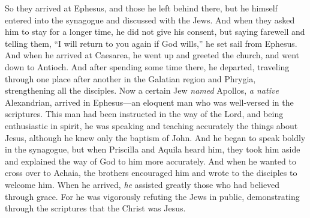 \begin{biblechapter}
\verse So they arrived at Ephesus, and those he left behind there, but he himself entered into the synagogue and discussed with the Jews.
\verse And when they asked him to stay for a longer time, he did not give his consent,
\verse but saying farewell and telling them, “I will return to you again if God wills,” he set sail from Ephesus.
\verse And when he arrived at Caesarea, he went up and greeted the church, and went down to Antioch.
\verse And after spending some time there, he departed, traveling through one place after another in the Galatian region and Phrygia, strengthening all the disciples.
 Now a certain Jew \textit{named} Apollos, \textit{a native} Alexandrian, arrived in Ephesus—an eloquent man who was well-versed in the scriptures.
\verse This man had been instructed in the way of the Lord, and being enthusiastic in spirit, he was speaking and teaching accurately the things about Jesus, although he knew only the baptism of John.
\verse And he began to speak boldly in the synagogue, but when Priscilla and Aquila heard him, they took him aside and explained the way of God to him more accurately.
\verse And when he wanted to cross over to Achaia, the brothers encouraged him and wrote to the disciples to welcome him. When he arrived, \textit{he} assisted greatly those who had believed through grace.
\verse For he was vigorously refuting the Jews in public, demonstrating through the scriptures that the Christ was Jesus.
\end{biblechapter}

